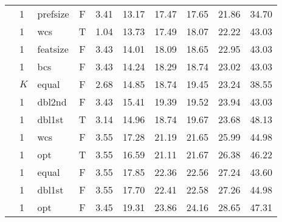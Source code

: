 \begin{table}[ht]
\begin{minipage}{\textwidth}
\begin{tabular}{lllcrrrrrr}
  & 1 & prefsize & F & 3.41 & 13.17 & 17.47 & 17.65 & 21.86 & 34.70 \\ 
  & 1 & wcs & T & 1.04 & 13.73 & 17.49 & 18.07 & 22.22 & 43.03 \\ 
  & 1 & featsize & F & 3.43 & 14.01 & 18.09 & 18.65 & 22.95 & 43.03 \\ 
  & 1 & bcs & F & 3.43 & 14.24 & 18.29 & 18.74 & 23.02 & 43.03 \\ 
  & $K$ & equal & F & 2.68 & 14.85 & 18.74 & 19.45 & 23.24 & 38.55 \\ 
  & 1 & dbl2nd & F & 3.43 & 15.41 & 19.39 & 19.52 & 23.94 & 43.03 \\ 
  & 1 & dbl1st & T & 3.14 & 14.96 & 18.74 & 19.67 & 23.68 & 48.13 \\ 
  & 1 & wcs & F & 3.55 & 17.28 & 21.19 & 21.65 & 25.99 & 44.98 \\ 
  & 1 & opt & T & 3.55 & 16.59 & 21.11 & 21.67 & 26.38 & 46.22 \\ 
  & 1 & equal & F & 3.55 & 17.85 & 22.36 & 22.56 & 27.24 & 43.60 \\ 
  & 1 & dbl1st & F & 3.55 & 17.70 & 22.41 & 22.58 & 27.26 & 44.98 \\ 
  & 1 & opt & F & 3.45 & 19.31 & 23.86 & 24.16 & 28.65 & 47.31 \\ 
 \bottomrule
\end{tabular}
\end{minipage}
\end{table}